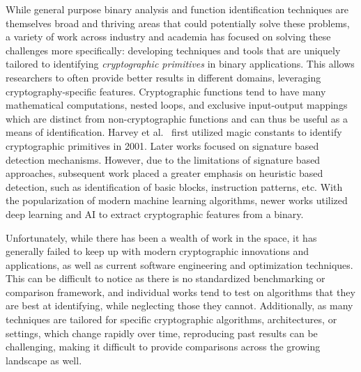 

While general purpose binary analysis and function identification techniques are themselves broad and thriving areas that could potentially solve these problems, a variety of work across industry and academia has focused on solving these challenges more specifically: developing techniques and tools that are uniquely tailored to identifying \textit{cryptographic primitives} in binary applications.  This allows researchers to often provide better results in different domains, leveraging cryptography-specific features.
Cryptographic functions tend to have many mathematical computations,
nested loops, and exclusive input-output mappings which are distinct from
non-cryptographic functions and can thus be useful as a means of identification. 
Harvey et al.~\cite{harvey2001cipher} first utilized magic constants to identify
cryptographic primitives in 2001. Later works focused on signature
based detection mechanisms. However, due to the limitations of signature
based approaches, subsequent work placed a greater emphasis on heuristic based detection, such as
identification of basic blocks, instruction patterns, etc. With the
popularization of modern machine learning algorithms, newer works utilized
deep learning and AI to extract cryptographic features from a binary.

Unfortunately, while there has been a wealth of work in the space, it has generally failed to keep up with modern cryptographic
innovations and applications, as well as current software engineering and optimization techniques.
This can be difficult to notice as there is no standardized benchmarking or comparison framework, and individual works tend to test on algorithms that they are best at identifying, while neglecting those they cannot.
Additionally, as many techniques are tailored for specific cryptographic algorithms, architectures, or settings, which change rapidly over time, reproducing past results can be challenging, making it difficult to provide comparisons across the growing landscape as well.

